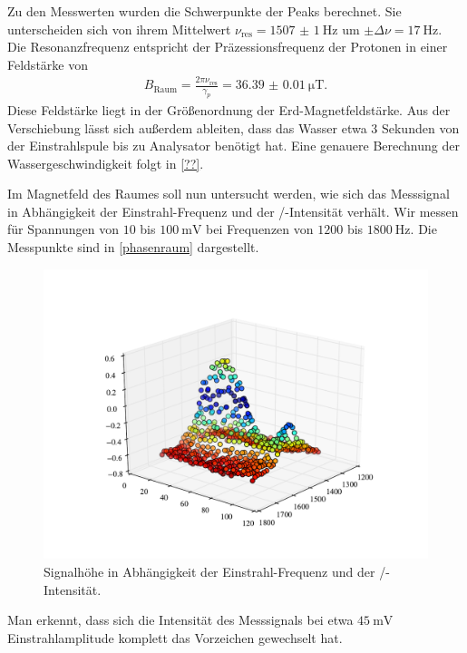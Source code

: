 \documentclass[paper=a4,
	fontsize=10pt,
	DIV=18,
	twocolumn,
	parskip=half
	]{scrartcl}
\numberwithin{equation}{section}    %
\begin{document}
Zu den Messwerten wurden die Schwerpunkte der Peaks berechnet. Sie unterscheiden sich von ihrem Mittelwert $\nu_{\mathrm{res}}=\SI{1507(1)}{\hertz}$ um  $\pm \Delta \nu=\SI{17}{\hertz}$.
Die Resonanzfrequenz entspricht der Präzessionsfrequenz der Protonen in einer Feldstärke von 
\begin{align}
	B_{\mathrm{Raum}}=\frac{2 \pi \nu_{\mathrm{res}}}{\gamma_p}=\SI[separate-uncertainty=false]{36.39(1)}{\micro\tesla}.
\end{align}
Diese Feldstärke liegt in der Größenordnung der Erd-Magnetfeldstärke.
Aus der Verschiebung lässt sich außerdem ableiten, dass das Wasser etwa $3$ Sekunden von der Einstrahlspule bis zu Analysator benötigt hat.
Eine genauere Berechnung der Wassergeschwindigkeit folgt in \ref{??}.

Im Magnetfeld des Raumes soll nun untersucht werden, wie sich das Messsignal in Abhängigkeit der Einstrahl-Frequenz und der /-Intensität verhält.
Wir messen für Spannungen von $10$ bis $\SI{100}{\milli\volt}$ bei Frequenzen von $1200$ bis $\SI{1800}{\hertz}$.
Die Messpunkte sind in \cref{phasenraum} dargestellt.
\begin{figure}[htp]
	\begin{center}
		\includegraphics[width=\columnwidth]{Data-Plots/07-Phasenraum.pdf}
		\caption{Signalhöhe in Abhängigkeit der Einstrahl-Frequenz und der /-Intensität.}
		\label{gewichte}
	\end{center}
\end{figure}
Man erkennt, dass sich die Intensität des Messsignals bei etwa $\SI{45}{\milli\volt}$ Einstrahlamplitude komplett das Vorzeichen gewechselt hat. 
\end{document}
